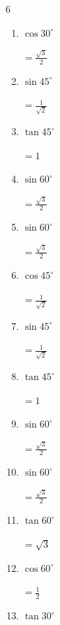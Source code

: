 \begin{multicols}{6}
\begin{enumerate}
        $\displaystyle =\frac{1}{2}$

  \item $\displaystyle \cos{30^\circ}$

        $\displaystyle =\frac{\sqrt{3}}{2}$

  \item $\displaystyle \sin{45^\circ}$

        $\displaystyle =\frac{1}{\sqrt{2}}$

  \item $\displaystyle \tan{45^\circ}$

        $\displaystyle =1$

  \item $\displaystyle \sin{60^\circ}$

        $\displaystyle =\frac{\sqrt{3}}{2}$

  \item $\displaystyle \sin{60^\circ}$

        $\displaystyle =\frac{\sqrt{3}}{2}$

\columnbreak %

  \item $\displaystyle \cos{45^\circ}$

        $\displaystyle =\frac{1}{\sqrt{2}}$

  \item $\displaystyle \sin{45^\circ}$

        $\displaystyle =\frac{1}{\sqrt{2}}$

  \item $\displaystyle \tan{45^\circ}$

        $\displaystyle =1$

  \item $\displaystyle \sin{60^\circ}$

        $\displaystyle =\frac{\sqrt{3}}{2}$

  \item $\displaystyle \sin{60^\circ}$

        $\displaystyle =\frac{\sqrt{3}}{2}$

  \item $\displaystyle \tan{60^\circ}$

        $\displaystyle =\sqrt{3}$

  \item $\displaystyle \cos{60^\circ}$

        $\displaystyle =\frac{1}{2}$

  \item $\displaystyle \tan{30^\circ}$


\end{enumerate}
\end{multicols}
